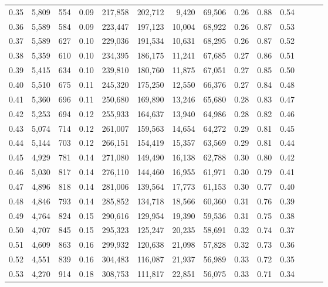 \begin{tabular}{rrrrrrrrrrrrrr}
0.35 &  5,809 &    554 &  0.09 &  217,858 &  202,712 &   9,420 &  69,506 &  0.26 &  0.88 &      0.54 \\
0.36 &  5,589 &    584 &  0.09 &  223,447 &  197,123 &  10,004 &  68,922 &  0.26 &  0.87 &      0.53 \\
0.37 &  5,589 &    627 &  0.10 &  229,036 &  191,534 &  10,631 &  68,295 &  0.26 &  0.87 &      0.52 \\
0.38 &  5,359 &    610 &  0.10 &  234,395 &  186,175 &  11,241 &  67,685 &  0.27 &  0.86 &      0.51 \\
0.39 &  5,415 &    634 &  0.10 &  239,810 &  180,760 &  11,875 &  67,051 &  0.27 &  0.85 &      0.50 \\
0.40 &  5,510 &    675 &  0.11 &  245,320 &  175,250 &  12,550 &  66,376 &  0.27 &  0.84 &      0.48 \\
0.41 &  5,360 &    696 &  0.11 &  250,680 &  169,890 &  13,246 &  65,680 &  0.28 &  0.83 &      0.47 \\
0.42 &  5,253 &    694 &  0.12 &  255,933 &  164,637 &  13,940 &  64,986 &  0.28 &  0.82 &      0.46 \\
0.43 &  5,074 &    714 &  0.12 &  261,007 &  159,563 &  14,654 &  64,272 &  0.29 &  0.81 &      0.45 \\
0.44 &  5,144 &    703 &  0.12 &  266,151 &  154,419 &  15,357 &  63,569 &  0.29 &  0.81 &      0.44 \\
0.45 &  4,929 &    781 &  0.14 &  271,080 &  149,490 &  16,138 &  62,788 &  0.30 &  0.80 &      0.42 \\
0.46 &  5,030 &    817 &  0.14 &  276,110 &  144,460 &  16,955 &  61,971 &  0.30 &  0.79 &      0.41 \\
0.47 &  4,896 &    818 &  0.14 &  281,006 &  139,564 &  17,773 &  61,153 &  0.30 &  0.77 &      0.40 \\
0.48 &  4,846 &    793 &  0.14 &  285,852 &  134,718 &  18,566 &  60,360 &  0.31 &  0.76 &      0.39 \\
0.49 &  4,764 &    824 &  0.15 &  290,616 &  129,954 &  19,390 &  59,536 &  0.31 &  0.75 &      0.38 \\
0.50 &  4,707 &    845 &  0.15 &  295,323 &  125,247 &  20,235 &  58,691 &  0.32 &  0.74 &      0.37 \\
0.51 &  4,609 &    863 &  0.16 &  299,932 &  120,638 &  21,098 &  57,828 &  0.32 &  0.73 &      0.36 \\
0.52 &  4,551 &    839 &  0.16 &  304,483 &  116,087 &  21,937 &  56,989 &  0.33 &  0.72 &      0.35 \\
0.53 &  4,270 &    914 &  0.18 &  308,753 &  111,817 &  22,851 &  56,075 &  0.33 &  0.71 &      0.34 \\

\end{tabular}
